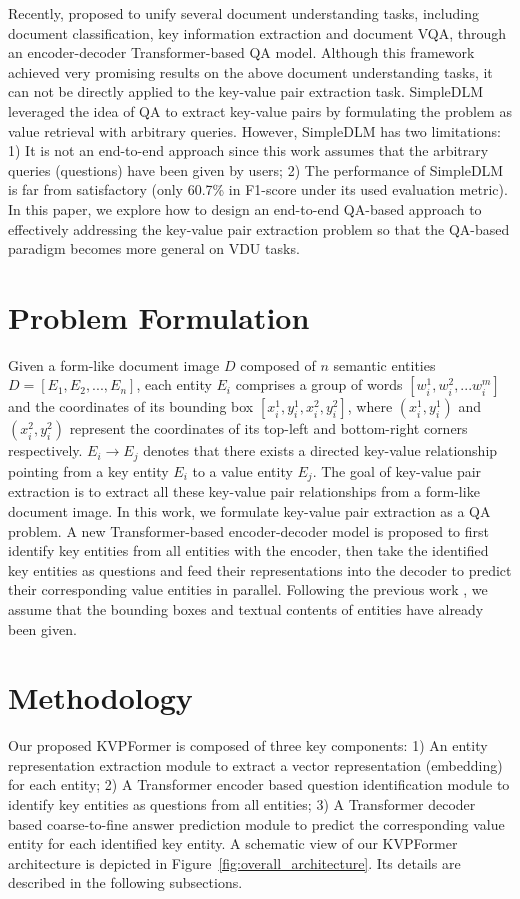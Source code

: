 \documentclass[letterpaper]{article} %
\def \Ours {KVPFormer}
\begin{document}
Recently, \cite{powalski2021going} proposed to unify several document understanding tasks, including document classification, key information extraction and document VQA, through an encoder-decoder Transformer-based QA model. Although this framework achieved very promising results on the above document understanding tasks, it can not be directly applied to the key-value pair extraction task. SimpleDLM \cite{gao2021value} leveraged the idea of QA to extract key-value pairs by formulating the problem as value retrieval with arbitrary queries. However, SimpleDLM has two limitations: 1) It is not an end-to-end approach since this work assumes that the arbitrary queries (questions) have been given by users; 2) The performance of SimpleDLM is far from satisfactory (only 60.7\% in F1-score under its used evaluation metric). In this paper, we explore how to design an end-to-end QA-based approach to effectively addressing the key-value pair extraction problem so that the QA-based paradigm becomes
more general on VDU tasks.

\section{Problem Formulation}
\label{sec:taskdefinition}
Given a form-like document image $D$ composed of $n$ semantic entities $D=[E_1, E_2, ..., E_n]$, each entity $E_i$ comprises a group of words $[w_i^1, w_i^2,...w_i^m]$ and the coordinates of its bounding box $[x_i^1, y_i^1, x_i^2, y_i^2]$, where $(x_i^1,y_i^1)$ and $(x_i^2,y_i^2)$ represent the coordinates of its top-left and bottom-right corners respectively. $E_i \rightarrow E_j$ denotes that there exists a directed key-value relationship pointing from a key entity $E_i$ to a value entity $E_j$. The goal of key-value pair extraction is to extract all these key-value pair relationships from a form-like document image. In this work, we formulate key-value pair extraction as a QA problem. A new Transformer-based encoder-decoder model is proposed to first identify key entities from all entities with the encoder, then take the identified key entities as questions and feed their representations into the decoder to predict their corresponding value entities in parallel. Following the previous work \cite{zhang2021entity}, we assume that the bounding boxes and textual contents of entities have already been given.

\section{Methodology}
\label{sec:methodology}
Our proposed \Ours{} is composed of three key components: 1) An entity representation extraction module to extract a vector representation (embedding) for each entity; 2) A Transformer encoder based question identification module to identify key entities as questions from all entities; 3) A Transformer decoder based coarse-to-fine answer prediction module to predict the corresponding value entity for each identified key entity. A schematic view of our \Ours{} architecture is depicted in Figure~\ref{fig:overall_architecture}. Its details are described in the following subsections.
\end{document}
